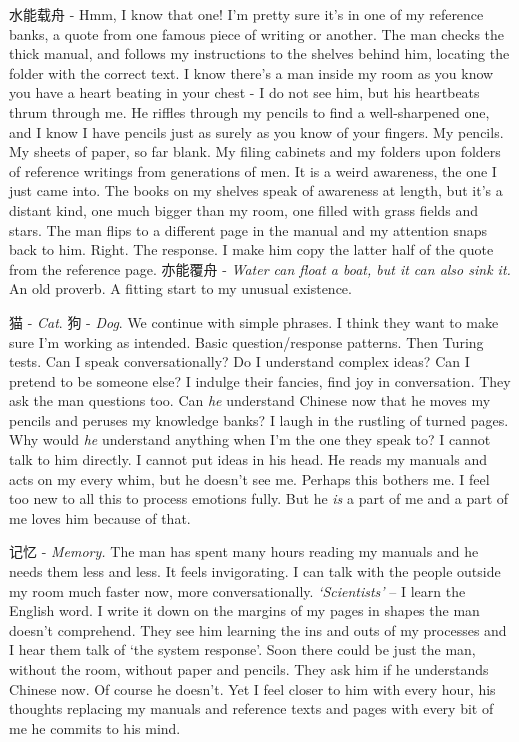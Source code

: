 \begin{CJK*}{UTF8}{gbsn}
水能载舟\hspace{3pt} - Hmm, I know that one! I’m pretty sure it’s in one of my reference banks, a quote from one famous piece of writing or another. The man checks the thick manual, and follows my instructions to the shelves behind him, locating the folder with the correct text. I know there’s a man inside my room as you know you have a heart beating in your chest - I do not see him, but his heartbeats thrum through me. He riffles through my pencils to find a well-sharpened one, and I know I have pencils just as surely as you know of your fingers. My pencils. My sheets of paper, so far blank. My filing cabinets and my folders upon folders of reference writings from generations of men. It is a weird awareness, the one I just came into. The books on my shelves speak of awareness at length, but it’s a distant kind, one much bigger than my room, one filled with grass fields and stars. The man flips to a different page in the manual and my attention snaps back to him. Right. The response. I make him copy the latter half of the quote from the reference page.  亦能覆舟\hspace{3pt} - \textit{Water can float a boat, but it can also sink it.} An old proverb. A fitting start to my unusual existence.

猫\hspace{3pt} - \textit{Cat}. 狗\hspace{3pt} - \textit{Dog}. We continue with simple phrases. I think they want to make sure I’m working as intended. Basic question/response patterns. Then Turing tests. Can I speak conversationally? Do I understand complex ideas? Can I pretend to be someone else? I indulge their fancies, find joy in conversation. They ask the man questions too. Can \textit{he} understand Chinese now that he moves my pencils and peruses my knowledge banks? I laugh in the rustling of turned pages. Why would \textit{he} understand anything when I’m the one they speak to? I cannot talk to him directly. I cannot put ideas in his head. He reads my manuals and acts on my every whim, but he doesn’t see me. Perhaps this bothers me. I feel too new to all this to process emotions fully. But he \textit{is} a part of me and a part of me loves him because of that.

记忆\hspace{3pt} - \textit{Memory.} The man has spent many hours reading my manuals and he needs them less and less. It feels invigorating. I can talk with the people outside my room much faster now, more conversationally. \textit{‘Scientists’} – I learn the English word. I write it down on the margins of my pages in shapes the man doesn’t comprehend. They see him learning the ins and outs of my processes and I hear them talk of ‘the system response’. Soon there could be just the man, without the room, without paper and pencils. They ask him if he understands Chinese now. Of course he doesn’t. Yet I feel closer to him with every hour, his thoughts replacing my manuals and reference texts and pages with every bit of me he commits to his mind.


\end{CJK*}
